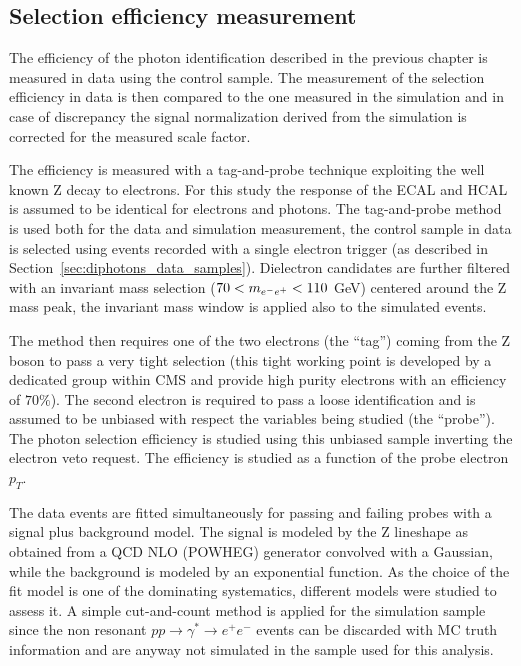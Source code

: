 
\subsection{Selection efficiency measurement}
\label{sec:dipho_eff}
The efficiency of the photon identification described in the previous chapter is measured in data
using the \Zee control sample. The measurement of the selection efficiency in data is then
compared to the one measured in the simulation and in case of discrepancy the signal normalization
derived from the simulation is corrected for the measured scale factor.

The efficiency is measured with a tag-and-probe technique exploiting the well known Z decay to electrons.
For this study the response of the ECAL and HCAL is assumed to be identical for electrons and photons.
The tag-and-probe method is used both for the data and simulation measurement, the \Zee control sample
in data is selected using events recorded with a single electron trigger (as described in Section~\ref{sec:diphotons_data_samples}).
Dielectron candidates
are further filtered with an invariant mass selection ($70 < m_{e^-e^+} < 110$ GeV) centered around the Z mass peak,
the invariant mass window is applied also to the simulated events.

The method then requires one of the two electrons (the ``tag'') coming from the Z boson to pass a very tight selection
(this tight working point is developed by a dedicated group within CMS and provide high purity electrons
with an efficiency of $70\%$).
The second electron is required to pass a loose identification and is assumed to be unbiased
with respect the variables being studied (the ``probe''). The photon selection efficiency is studied using
this unbiased sample inverting the electron veto request.
The efficiency is studied as a function of the probe electron $p_T$.

The data  events are fitted
simultaneously for passing and failing probes with a signal plus background model.
The signal is modeled by the Z lineshape as obtained from a QCD NLO (POWHEG)
generator convolved with a Gaussian, while the background is modeled by an exponential function. As
the choice of the fit model is one of the dominating systematics, different models were
studied to assess it. A simple cut-and-count method is applied for the simulation sample
since the non resonant $pp \to \gamma^* \to e^+e^-$ events can be discarded with MC truth information and
are anyway not simulated in the sample used for this analysis.

